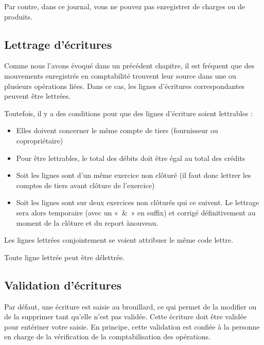 \documentclass[a4paper,10pt,oneside,french]{sphinxmanual}
\begin{document}
\sphinxAtStartPar
Par contre, dans ce journal, vous ne pouvez pas enregistrer de charges ou de produits.


\subsection{Lettrage d’écritures}
\label{\detokenize{accounting/entity:lettrage-d-ecritures}}
\sphinxAtStartPar
Comme nous l’avons évoqué dans un précédent chapitre, il est fréquent que des mouvements enregistrés en comptabilité trouvent leur source dans une ou plusieurs opérations liées. Dans ce cas, les lignes d’écritures correspondantes peuvent être lettrées.

\sphinxAtStartPar
Toutefois, il y a des conditions pour que des lignes d’écriture soient lettrables :
\begin{itemize}
\item {} 
\sphinxAtStartPar
Elles doivent concerner le même compte de tiers (fournisseur ou copropriétaire)

\item {} 
\sphinxAtStartPar
Pour être lettrables, le total des débits doit être égal au total des crédits

\item {} 
\sphinxAtStartPar
Soit les lignes sont d’un même exercice non clôturé (il faut donc lettrer les comptes de tiers avant clôture de l’exercice)

\item {} 
\sphinxAtStartPar
Soit les lignes sont sur deux exercices non clôturés qui ce suivent. Le lettrage sera alors temporaire (avec un « \& » en suffix) et corrigé définitivement au moment de la clôture et du report à\sphinxhyphen{}nouveau.

\end{itemize}

\sphinxAtStartPar
Les lignes lettrées conjointement se voient attribuer le même code lettre.

\sphinxAtStartPar
Toute ligne lettrée peut être délettrée.


\subsection{Validation d’écritures}
\label{\detokenize{accounting/entity:validation-d-ecritures}}
\sphinxAtStartPar
Par défaut, une écriture est saisie au brouillard, ce qui permet de la modifier ou de la supprimer tant qu’elle n’est pas validée.
Cette écriture doit être validée pour entériner votre saisie. En principe, cette validation est confiée à la personne en charge de la vérification de la comptabilisation des opérations.
\end{document}
